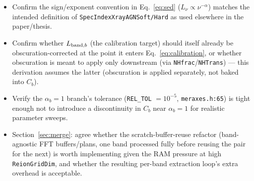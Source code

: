 \documentclass[11pt]{article}
\newcommand{\code}[1]{\texttt{#1}}
\begin{document}
\begin{itemize}
  \item Confirm the sign/exponent convention in Eq.~\eqref{eq:sed}
    ($L_\nu \propto \nu^{-\alpha}$) matches the intended definition of
    \code{SpecIndexXrayAGNSoft/Hard} as used elsewhere in the paper/thesis.
  \item Confirm whether $L_{{\rm band},b}$ (the calibration target) should
    itself already be obscuration-corrected at the point it enters
    Eq.~\eqref{eq:calibration}, or whether obscuration is meant to apply
    only downstream (via \code{NHfrac}/\code{NHTrans}) — this derivation
    assumes the latter (obscuration is applied separately, not baked into
    $C_b$).
  \item Verify the $\alpha_b=1$ branch's tolerance (\code{REL\_TOL}
    $=10^{-5}$, \code{meraxes.h:65}) is tight enough not to introduce a
    discontinuity in $C_b$ near $\alpha_b=1$ for realistic parameter
    sweeps.
  \item Section~\ref{sec:merge}: agree whether the scratch-buffer-reuse
    refactor (band-agnostic FFT buffers/plans, one band processed fully
    before reusing the pair for the next) is worth implementing given the
    RAM pressure at high \code{ReionGridDim}, and whether the resulting
    per-band extraction loop's extra overhead is acceptable.
\end{itemize}
\end{document}
